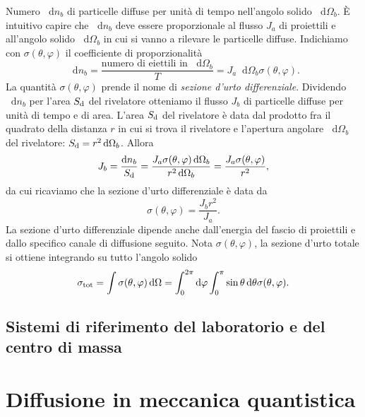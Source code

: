 \documentclass[a4paper,fleqn,twoside,12pt]{article}
\renewcommand{\phi}{\varphi}
\newcommand*{\dd}{\mathop{}\!\mathrm{d}} %
\begin{document}
Numero $\dd n_{b}$ di particelle diffuse per unità di tempo nell'angolo solido
$\dd\Omega_{b}$.  È intuitivo capire che $\dd n_{b}$ deve essere proporzionale
al flusso $J_{a}$ di proiettili e all'angolo solido $\dd\Omega_{b}$ in cui si
vanno a rilevare le particelle diffuse.  Indichiamo con $\sigma(\theta,\phi)$ il
coefficiente di proporzionalità
\begin{equation}
  \dd n_{b} = \frac{\text{numero di eiettili in $\dd\Omega_{b}$}}{T} = J_{a}
  \dd\Omega_{b} \sigma(\theta,\phi).
\end{equation}
La quantità $\sigma(\theta,\phi)$ prende il nome di
\emph{sezione d'urto differenziale}.  Dividendo $\dd n_{b}$ per l'area
$S_{\textup{d}}$ del rivelatore otteniamo il flusso $J_{b}$ di particelle
diffuse per unità di tempo e di area.  L'area $S_{\textup{d}}$ del rivelatore è
data dal prodotto fra il quadrato della distanza $r$ in cui si trova il
rivelatore e l'apertura angolare $\dd\Omega_{b}$ del rivelatore:
$S_{\textup{d}} = r^{2}\dd\Omega_{b}$.  Allora
\begin{equation}
  J_{b} = \frac{\dd n_{b}}{S_{\textup{d}}} = \frac{J_{a} \sigma(\theta,\phi)
    \dd\Omega_{b}}{r^{2} \dd\Omega_{b}} = \frac{J_{a}
    \sigma(\theta,\phi)}{r^{2}},
\end{equation}
da cui ricaviamo che la sezione d'urto differenziale è data da
\begin{equation}
  \label{eq:sezione-d'urto}
  \sigma(\theta,\phi) = \frac{J_{b}r^{2}}{J_{a}}.
\end{equation}
La sezione d'urto differenziale dipende anche dall'energia del fascio di
proiettili e dallo specifico canale di diffusione seguito.  Nota
$\sigma(\theta,\phi)$, la sezione d'urto totale si ottiene integrando su tutto
l'angolo solido
\begin{equation}
  \sigma_{\textup{tot}} = \int \sigma(\theta,\phi) \dd\Omega = \int_{0}^{2\pi}
  \dd \phi \int_{0}^{\pi} \sin \theta \dd\theta \sigma(\theta,\phi).
\end{equation}

\subsection{Sistemi di riferimento del laboratorio e del centro di massa}
\label{sec:sistemi-riferimento}

\section{Diffusione in meccanica quantistica}
\label{sec:meccanica-quantistica}
\end{document}
